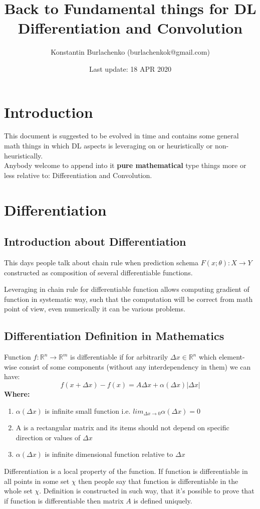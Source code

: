 \documentclass[12pt,a4paper]{article}
\title{\textbf{Back to Fundamental things for DL}\\Differentiation and Convolution}
\date{Last update: 18 APR 2020}
\author{Konstantin Burlachenko (burlachenkok@gmail.com)}
\theoremstyle{plain}
\begin{document}
\maketitle
\tableofcontents
\section{Introduction}
This document is suggested to be evolved in time and contains some general math things in which DL aspects is leveraging on or heuristically or non-heuristically.\\
Anybody welcome to append into it \textbf{pure mathematical} type things more or less relative to: Differentiation and Convolution.
\section{Differentiation}
\subsection{Introduction about Differentiation}
This days people talk about chain rule when prediction schema $F(x;\theta):X \to Y$ constructed as composition of several differentiable functions.

Leveraging in chain rule for differentiable function allows computing gradient of function in systematic way, such that the computation will be correct from math point of view, even numerically it can be various problems.
\subsection{Differentiation Definition in Mathematics}
Function $f:\mathbb{R}^{n} \rightarrow \mathbb{R}^{m}$ 
is differentiable if for arbitrarily $\varDelta x \in \mathbb{R}^{n}$ which element-wise consist of some components (without any interdependency in them) we can have:
\begin{equation}
f(x+\varDelta x)-f(x) = A \varDelta x + \alpha(\varDelta x)|\varDelta x|
\end{equation} 
\textbf{Where:}
\begin{enumerate}
 \item $\alpha(\varDelta x)$ is infinite small function i.e. $lim_{\varDelta x \rightarrow 0} \alpha(\varDelta x) = 0$
 \item A is a rectangular matrix and its items should not depend on specific direction or values of $\varDelta x$
 \item $\alpha(\varDelta x)$ is infinite dimensional function relative to $\varDelta x$
\end{enumerate}
Differentiation is a local property of the function. If function is differentiable in all points in some set $\chi$ then people say that function is differentiable in the whole set $\chi$.
Definition is constructed in such way, that it's possible to prove that if function is differentiable then matrix $A$ is defined uniquely.
\end{document}
